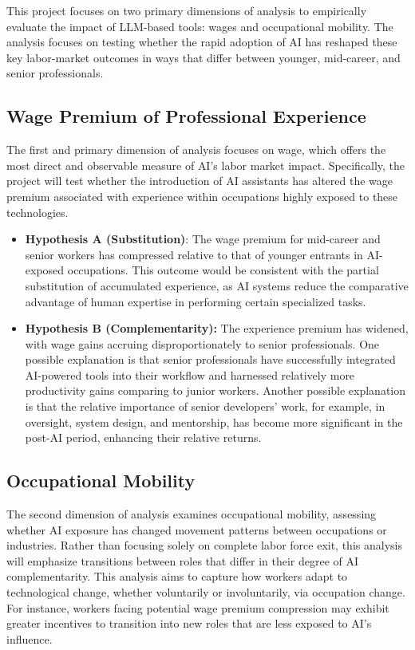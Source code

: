 \documentclass[12pt]{article}
\begin{document}
This project focuses on two primary dimensions of analysis to empirically evaluate the impact of LLM-based tools: wages and occupational mobility. The analysis focuses on testing whether the rapid adoption of AI has reshaped these key labor-market outcomes in ways that differ between younger, mid-career, and senior professionals.

\subsection{Wage Premium of Professional Experience}

The first and primary dimension of analysis focuses on wage, which offers the most direct and observable measure of AI's labor market impact. Specifically, the project will test whether the introduction of AI assistants has altered the wage premium associated with experience within occupations highly exposed to these technologies. 

\begin{itemize}
    \item \textbf{Hypothesis A (Substitution)}: The wage premium for mid-career and senior workers has compressed relative to that of younger entrants in AI-exposed occupations. This outcome would be consistent with the partial substitution of accumulated experience, as AI systems reduce the comparative advantage of human expertise in performing certain specialized tasks. 
    \item \textbf{Hypothesis B (Complementarity):} The experience premium has widened, with wage gains accruing disproportionately to senior professionals.  One possible explanation is that senior professionals have successfully integrated AI-powered tools into their workflow and harnessed relatively more productivity gains comparing to junior workers. Another possible explanation is that the relative importance of senior developers’ work, for example, in oversight, system design, and mentorship, has become more significant in the post-AI period, enhancing their relative returns.
\end{itemize}

\subsection{Occupational Mobility}

The second dimension of analysis examines occupational mobility, assessing whether AI exposure has changed movement patterns between occupations or industries. Rather than focusing solely on complete labor force exit, this analysis will emphasize transitions between roles that differ in their degree of AI complementarity. This analysis aims to capture how workers adapt to technological change, whether voluntarily or involuntarily, via occupation change. For instance, workers facing potential wage premium compression may exhibit greater incentives to transition into new roles that are less exposed to AI's influence. 
\end{document}
